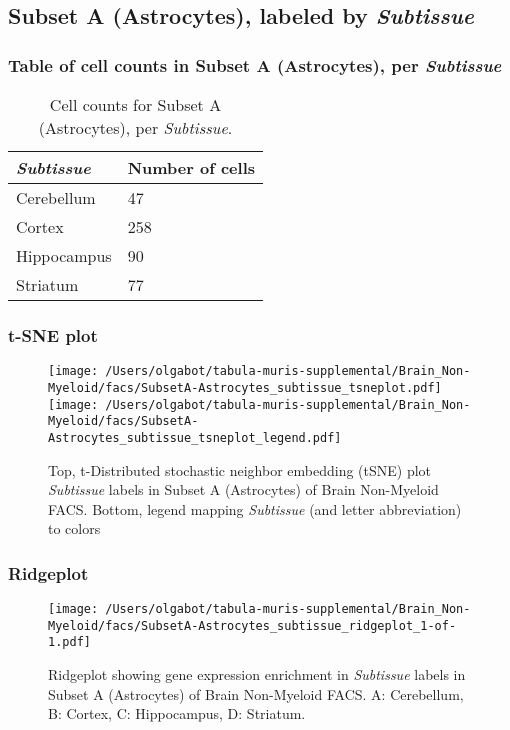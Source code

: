 \subsection{Subset A (Astrocytes), labeled by \emph{Subtissue}}
\subsubsection{Table of cell counts in Subset A (Astrocytes), per \emph{Subtissue}}\begin{table}[h]
\centering
\label{my-label}
\begin{tabular}{@{}ll@{}}
\toprule

\emph{Subtissue}& Number of cells \\ \midrule
Cerebellum & 47 \\

Cortex & 258 \\

Hippocampus & 90 \\

Striatum & 77 \\
\bottomrule
\end{tabular}
\caption{Cell counts for Subset A (Astrocytes), per \emph{Subtissue}.}
\end{table}

\clearpage
\subsubsection{t-SNE plot}
\begin{figure}[h]
\centering
\texttt{[image: /Users/olgabot/tabula-muris-supplemental/Brain\_Non-Myeloid/facs/SubsetA-Astrocytes\_subtissue\_tsneplot.pdf]}
\texttt{[image: /Users/olgabot/tabula-muris-supplemental/Brain\_Non-Myeloid/facs/SubsetA-Astrocytes\_subtissue\_tsneplot\_legend.pdf]}
\caption{Top, t-Distributed stochastic neighbor embedding (tSNE) plot  \emph{Subtissue} labels in Subset A (Astrocytes) of Brain Non-Myeloid FACS. Bottom, legend mapping \emph{Subtissue} (and letter abbreviation) to colors}
\end{figure}


\clearpage

\subsubsection{Ridgeplot}
\begin{figure}[h]
\centering
\texttt{[image: /Users/olgabot/tabula-muris-supplemental/Brain\_Non-Myeloid/facs/SubsetA-Astrocytes\_subtissue\_ridgeplot\_1-of-1.pdf]}

\caption{ Ridgeplot  showing gene expression enrichment in \emph{Subtissue} labels in Subset A (Astrocytes) of Brain Non-Myeloid FACS. A: Cerebellum, B: Cortex, C: Hippocampus, D: Striatum.}
\end{figure}


